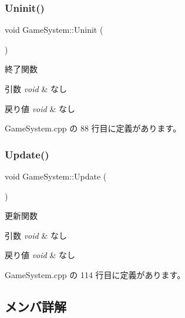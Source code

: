 \subsubsection{\texorpdfstring{Uninit()}{Uninit()}}
{\footnotesize\ttfamily void Game\+System\+::\+Uninit (\begin{DoxyParamCaption}{ }\end{DoxyParamCaption})}



終了関数 


\begin{DoxyParams}{引数}
{\em void} & なし \\
\hline
\end{DoxyParams}

\begin{DoxyRetVals}{戻り値}
{\em void} & なし \\
\hline
\end{DoxyRetVals}


 Game\+System.\+cpp の 88 行目に定義があります。

\mbox{\label{class_game_system_ab0add1f2bd97d3b125a5682f571053a3}} 
\subsubsection{\texorpdfstring{Update()}{Update()}}
{\footnotesize\ttfamily void Game\+System\+::\+Update (\begin{DoxyParamCaption}{ }\end{DoxyParamCaption})}



更新関数 


\begin{DoxyParams}{引数}
{\em void} & なし \\
\hline
\end{DoxyParams}

\begin{DoxyRetVals}{戻り値}
{\em void} & なし \\
\hline
\end{DoxyRetVals}


 Game\+System.\+cpp の 114 行目に定義があります。



\subsection{メンバ詳解}
\mbox{\label{class_game_system_ac398ab7a013177879fd3dd9a9f8d7e48}} 
